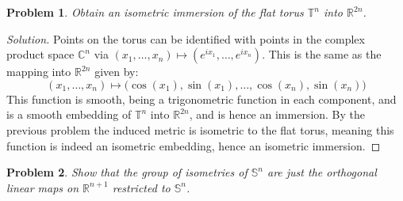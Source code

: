 \documentclass{article}
\theoremstyle{normal}
\newtheorem{problem}{Problem}
\begin{document}
    \begin{problem}
        Obtain an isometric immersion of the flat torus
        $\mathbb{T}^{n}$ into $\mathbb{R}^{2n}$.
    \end{problem}
    \begin{proof}[Solution]
        Points on the torus can be identified with points in the complex
        product space $\mathbb{C}^{n}$ via
        $(x_{1},\dots,x_{n})\mapsto(e^{ix_{1}},\dots,e^{ix_{n}})$. This is
        the same as the mapping into $\mathbb{R}^{2n}$ given by:
        \begin{equation}
            (x_{1},\dots,x_{n})\mapsto
            \big(\cos(x_{1}),\sin(x_{1}),\dots,\cos(x_{n}),\sin(x_{n})\big)
        \end{equation}
        This function is smooth, being a trigonometric function in each
        component, and is a smooth embedding of $\mathbb{T}^{n}$ into
        $\mathbb{R}^{2n}$, and is hence an immersion. By the previous problem
        the induced metric is isometric to the flat torus, meaning this function
        is indeed an isometric embedding, hence an isometric immersion.
    \end{proof}
    \begin{problem}
        Show that the group of isometries of $\mathbb{S}^{n}$ are just the
        orthogonal linear maps on $\mathbb{R}^{n+1}$ restricted to
        $\mathbb{S}^{n}$.
    \end{problem}
\end{document}
